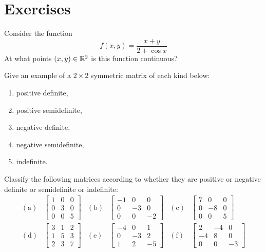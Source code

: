 

\section*{Exercises}
\begin{problem}[Basic]
Consider the function
\begin{equation*}
f(x,y) = \dfrac{x+y}{2+\cos x}
\end{equation*}
At what points $(x,y) \in \mathbb{R}^2$ is this function continuous?
\end{problem}

\begin{problem}[Intermediate]
Give an example of a $2 \times 2$ symmetric matrix of each kind below:
\begin{enumerate}
	\item positive definite, 
	\item positive semidefinite, 
	\item negative definite, 
	\item negative semidefinite,
	\item indefinite.
\end{enumerate}
\end{problem}

\begin{problem}[Basic]\cite[p.31, \#2]{peressini1988mathematics}
Classify the following matrices according to whether they are positive or negative definite or semidefinite or indefinite:
\begin{align*}
\mathrm{(a)} & \begin{bmatrix} 1 & 0 & 0 \\ 0 & 3 & 0 \\ 0 & 0 & 5 \end{bmatrix}  &
\mathrm{(b)} & \begin{bmatrix} -1 & 0 & 0 \\ 0 & -3 & 0 \\ 0 & 0 & -2 \end{bmatrix} &
\mathrm{(c)} & \begin{bmatrix} 7 & 0 & 0 \\ 0 & -8 & 0 \\ 0 & 0 & 5 \end{bmatrix}  \\
\mathrm{(d)} & \begin{bmatrix} 3 & 1 & 2 \\ 1 & 5 & 3 \\ 2 & 3 & 7 \end{bmatrix}  &
\mathrm{(e)} & \begin{bmatrix} -4 & 0 & 1 \\ 0 & -3 & 2 \\ 1 & 2 & -5 \end{bmatrix}  &
\mathrm{(f)} & \begin{bmatrix} 2 & -4 & 0 \\ -4 & 8 & 0 \\ 0 & 0 & -3 \end{bmatrix} 
\end{align*}
\end{problem}

